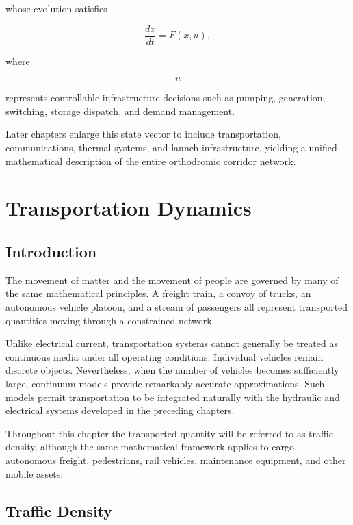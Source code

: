 \documentclass[11pt,fleqn]{book}
\numberwithin{equation}{chapter}
\theoremstyle{plain}
\theoremstyle{definition}
\theoremstyle{remark}
\begin{document}
whose evolution satisfies

\[
\boxed{
\frac{dx}{dt}
=
F(x,u),
}
\]

where

\[
u
\]

represents controllable infrastructure decisions such as pumping,
generation, switching, storage dispatch, and demand management.

Later chapters enlarge this state vector to include
transportation, communications, thermal systems, and launch
infrastructure, yielding a unified mathematical description of the
entire orthodromic corridor network.

\chapter{Transportation Dynamics}

\section{Introduction}

The movement of matter and the movement of people are governed by many of
the same mathematical principles. A freight train, a convoy of trucks,
an autonomous vehicle platoon, and a stream of passengers all represent
transported quantities moving through a constrained network.

Unlike electrical current, transportation systems cannot generally be
treated as continuous media under all operating conditions. Individual
vehicles remain discrete objects. Nevertheless, when the number of
vehicles becomes sufficiently large, continuum models provide remarkably
accurate approximations. Such models permit transportation to be
integrated naturally with the hydraulic and electrical systems developed
in the preceding chapters.

Throughout this chapter the transported quantity will be referred to as
traffic density, although the same mathematical framework applies to
cargo, autonomous freight, pedestrians, rail vehicles, maintenance
equipment, and other mobile assets.


\section{Traffic Density}
\end{document}
